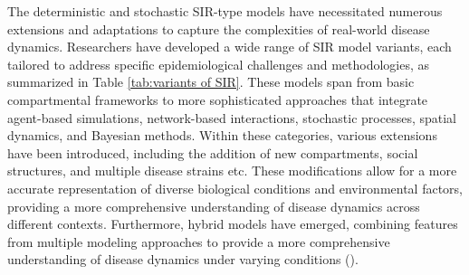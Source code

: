 \documentclass[sn-basic]{sn-jnl}%
\theoremstyle{thmstyleone}%
\theoremstyle{thmstyletwo}%
\theoremstyle{thmstylethree}%
\numberwithin{equation}{theorem}
\begin{document}
The deterministic and stochastic SIR-type models have necessitated numerous extensions and adaptations to capture the complexities of real-world disease dynamics. Researchers have developed a wide range of SIR model variants, each tailored to address specific epidemiological challenges and methodologies, as summarized in Table \ref{tab:variants of SIR}. These models span from basic compartmental frameworks to more sophisticated approaches that integrate agent-based simulations, network-based interactions, stochastic processes, spatial dynamics, and Bayesian methods. Within these categories, various extensions have been introduced, including the addition of new compartments, social structures, and multiple disease strains etc. These modifications allow for a more accurate representation of diverse biological conditions and environmental factors, providing a more comprehensive understanding of disease dynamics across different contexts. Furthermore, hybrid models have emerged, combining features from multiple modeling approaches to provide a more comprehensive understanding of disease dynamics under varying conditions (\citep{perez2009agent, wu2018hybrid, strano2017hybrid, zhao2019hybrid, small2015stochastic, pastor2014hybrid, white2016hybrid}).


\begin{table}[h]
\centering
{}
\caption{Comparison of epidemiological SIR models}
\label{tab:variants of SIR}
\end{table}
\end{document}
